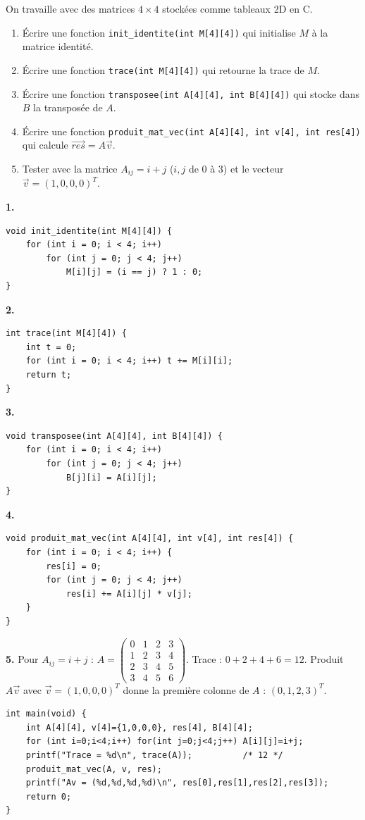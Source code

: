 \documentclass[12pt,a4paper]{article}
\begin{document}
\begin{boiteexercice}
On travaille avec des matrices $4\times4$ stockées comme tableaux 2D en C.
\begin{enumerate}
  \item Écrire une fonction \texttt{init\_identite(int M[4][4])} qui initialise $M$ à la matrice identité.
  \item Écrire une fonction \texttt{trace(int M[4][4])} qui retourne la trace de $M$.
  \item Écrire une fonction \texttt{transposee(int A[4][4], int B[4][4])} qui stocke dans $B$ la transposée de $A$.
  \item Écrire une fonction \texttt{produit\_mat\_vec(int A[4][4], int v[4], int res[4])} qui calcule $\vec{res} = A\vec{v}$.
  \item Tester avec la matrice $A_{ij}=i+j$ ($i,j$ de 0 à 3) et le vecteur $\vec{v}=(1,0,0,0)^T$.
\end{enumerate}
\end{boiteexercice}

\begin{boitecorrige}
\textbf{1.}
\begin{lstlisting}
void init_identite(int M[4][4]) {
    for (int i = 0; i < 4; i++)
        for (int j = 0; j < 4; j++)
            M[i][j] = (i == j) ? 1 : 0;
}
\end{lstlisting}

\textbf{2.}
\begin{lstlisting}
int trace(int M[4][4]) {
    int t = 0;
    for (int i = 0; i < 4; i++) t += M[i][i];
    return t;
}
\end{lstlisting}

\textbf{3.}
\begin{lstlisting}
void transposee(int A[4][4], int B[4][4]) {
    for (int i = 0; i < 4; i++)
        for (int j = 0; j < 4; j++)
            B[j][i] = A[i][j];
}
\end{lstlisting}

\textbf{4.}
\begin{lstlisting}
void produit_mat_vec(int A[4][4], int v[4], int res[4]) {
    for (int i = 0; i < 4; i++) {
        res[i] = 0;
        for (int j = 0; j < 4; j++)
            res[i] += A[i][j] * v[j];
    }
}
\end{lstlisting}

\textbf{5.} Pour $A_{ij}=i+j$ : $A = \begin{pmatrix}0&1&2&3\\1&2&3&4\\2&3&4&5\\3&4&5&6\end{pmatrix}$.
Trace : $0+2+4+6=12$. Produit $A\vec{v}$ avec $\vec{v}=(1,0,0,0)^T$ donne la première colonne de $A$ : $(0,1,2,3)^T$.
\begin{lstlisting}
int main(void) {
    int A[4][4], v[4]={1,0,0,0}, res[4], B[4][4];
    for (int i=0;i<4;i++) for(int j=0;j<4;j++) A[i][j]=i+j;
    printf("Trace = %d\n", trace(A));          /* 12 */
    produit_mat_vec(A, v, res);
    printf("Av = (%d,%d,%d,%d)\n", res[0],res[1],res[2],res[3]);
    return 0;
}
\end{lstlisting}
\end{boitecorrige}
\end{document}

